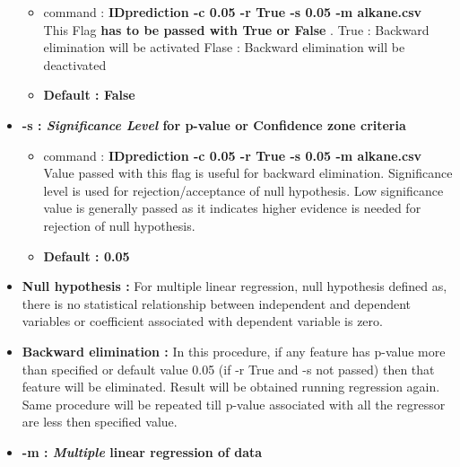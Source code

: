 \documentclass[12pt]{article}
\begin{document}
\begin{itemize}[wide = 0pt, labelwidth = 1.3333em, labelsep = 0.3333em, leftmargin = \dimexpr{} + \relax ]
\begin{itemize}
					\item command : \textbf{IDprediction -c 0.05 -r True -s 0.05 -m alkane.csv} \\
					\subitem This Flag \textbf{has to be passed with True or False  }.
				\subsubitem	True : Backward elimination will be activated 
				\subsubitem	Flase : Backward elimination will be deactivated \\
				\item \textbf{	Default : False }\\
				
				\end{itemize}
				
			\newpage
			
		\item \textbf{-s : \textit{Significance Level} for p-value or Confidence zone criteria } \\
		
			\begin{itemize}
				\item command : \textbf{IDprediction -c 0.05 -r True -s 0.05 -m alkane.csv} 
				\subitem Value passed with this flag is useful for backward elimination. Significance level is used for rejection/acceptance of null hypothesis. Low significance value is generally passed as it indicates higher evidence is needed for rejection of null hypothesis. 
				\item \textbf{Default : 0.05}				
			\end{itemize}
		
		\item \textbf{Null hypothesis :} For multiple linear regression, null hypothesis defined as, there is no statistical relationship between independent and dependent variables or coefficient associated with dependent variable is zero.	\\
		
		
		\item  	\textbf{Backward elimination :} In this procedure, if any feature has p-value more than specified or default value 0.05 (if -r True and -s not passed) then that feature will be eliminated. Result will be obtained running regression again. Same procedure will  be repeated till p-value associated with all the regressor are less then specified value.\\
	
		\item \textbf{-m : \textit{Multiple} linear regression of data } \\
		

\end{itemize}
\end{document}

